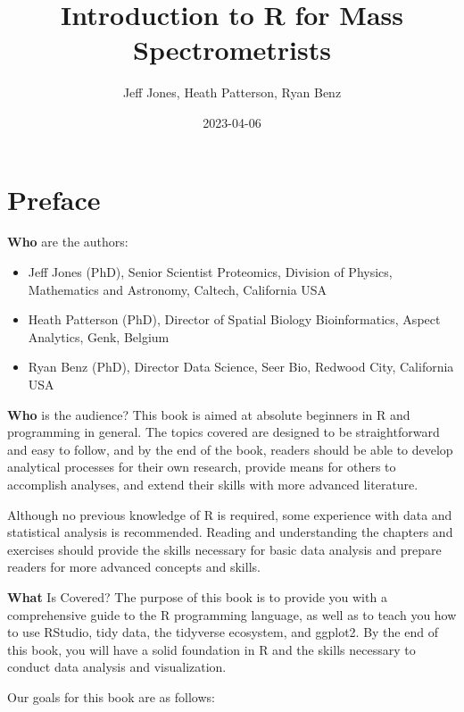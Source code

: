 \documentclass[
]{book}
\title{Introduction to R for Mass Spectrometrists}
\author{Jeff Jones, Heath Patterson, Ryan Benz}
\date{2023-04-06}
\begin{document}
\maketitle

{
\setcounter{tocdepth}{1}
\tableofcontents
}
\hypertarget{preface}{%
\chapter*{Preface}\label{preface}}

\textbf{Who} are the authors:

\begin{itemize}
\item
  Jeff Jones (PhD), Senior Scientist Proteomics, Division of Physics, Mathematics and Astronomy, Caltech, California USA
\item
  Heath Patterson (PhD), Director of Spatial Biology Bioinformatics, Aspect Analytics, Genk, Belgium
\item
  Ryan Benz (PhD), Director Data Science, Seer Bio, Redwood City, California USA
\end{itemize}

\textbf{Who} is the audience? This book is aimed at absolute beginners in R and programming in general. The topics covered are designed to be straightforward and easy to follow, and by the end of the book, readers should be able to develop analytical processes for their own research, provide means for others to accomplish analyses, and extend their skills with more advanced literature.

Although no previous knowledge of R is required, some experience with data and statistical analysis is recommended. Reading and understanding the chapters and exercises should provide the skills necessary for basic data analysis and prepare readers for more advanced concepts and skills.

\textbf{What} Is Covered? The purpose of this book is to provide you with a comprehensive guide to the R programming language, as well as to teach you how to use RStudio, tidy data, the tidyverse ecosystem, and ggplot2. By the end of this book, you will have a solid foundation in R and the skills necessary to conduct data analysis and visualization.

Our goals for this book are as follows:
\end{document}
